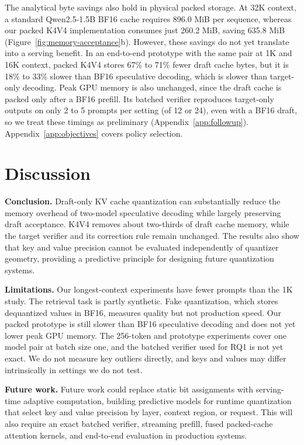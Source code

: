 \documentclass{article}
\begin{document}
The analytical byte savings also hold in physical packed storage. At 32K context, a standard Qwen2.5-1.5B BF16 cache requires 896.0 MiB per sequence, whereas our packed K4V4 implementation consumes just 260.2 MiB, saving 635.8 MiB (Figure~\ref{fig:memory-acceptance}b). However, these savings do not yet translate into a serving benefit. In an end-to-end prototype with the same pair at 1K and 16K context, packed K4V4 stores 67\% to 71\% fewer draft cache bytes, but it is 18\% to 33\% slower than BF16 speculative decoding, which is slower than target-only decoding. Peak GPU memory is also unchanged, since the draft cache is packed only after a BF16 prefill. Its batched verifier reproduces target-only outputs on only 2 to 5 prompts per setting (of 12 or 24), even with a BF16 draft, so we treat these timings as preliminary (Appendix~\ref{app:followup}). Appendix~\ref{app:objectives} covers policy selection.


\section{Discussion}

\textbf{Conclusion.} Draft-only KV cache quantization can substantially reduce
the memory overhead of two-model speculative decoding while largely preserving draft
acceptance. K4V4 removes about two-thirds of draft cache memory, while
the target verifier and its correction rule remain unchanged. The results also
show that key and value precision cannot be evaluated independently of
quantizer geometry,
providing a predictive principle for designing future quantization systems.

\textbf{Limitations.} Our longest-context experiments have fewer prompts than the 1K study. The
retrieval task is partly synthetic. Fake quantization, which stores dequantized values in BF16, measures quality but not
production speed. Our packed prototype is still slower than BF16
speculative decoding and does not yet lower peak GPU memory. The 256-token and prototype experiments cover one model pair at batch size one, and the batched verifier used for RQ1 is not yet exact. We do not measure key outliers directly, and keys and values may differ intrinsically in settings we do not test.

\textbf{Future work.} Future work could replace static bit assignments with serving-time adaptive
computation, building predictive models for runtime quantization that select key and value precision by layer, context region, or
request. This will also require an exact batched verifier, streaming prefill, fused packed-cache attention kernels, and end-to-end evaluation
in production systems.
\end{document}
